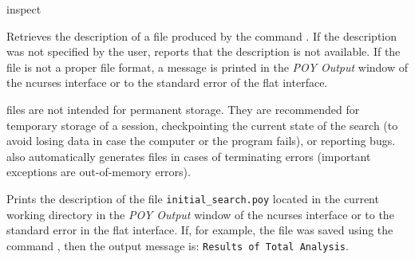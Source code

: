 \begin{command}{inspect}{}

	\syntax{\obligatory{(\poystring)}} 

	\begin{poydescription}
        Retrieves the description of a \poy file produced by the command . If the description was
        not specified by the user,  reports that the
        description is not available. If the file is not a proper
        \poy file format, a message is printed in the \emph{POY Output}
        window of the ncurses interface or to the standard error of the flat interface.

        \poy files are not intended for permanent storage. They are recommended
        for temporary storage of a \poy session, checkpointing
        the current state of the search (to avoid losing data in case the computer or the
        program fails), or reporting bugs. \poy also automatically
        generates \poy files in cases of terminating errors (important exceptions are
        out-of-memory errors). 

    \end{poydescription}

    \begin{poyexamples}
            {Prints the description of the \poy file \texttt{initial\_search.poy}
            located in the current working directory in the \emph{POY Output}
            window of the ncurses interface or to the standard error in the flat
            interface. If, for example, the file was saved using
            the command , then the output message is: \texttt{Results of
            Total Analysis}.}
    \end{poyexamples}

    \begin{poyalso}
    \end{poyalso}

\end{command}

